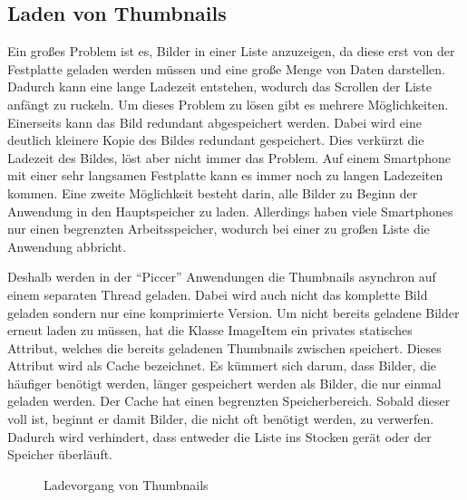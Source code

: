 \subsection{Laden von Thumbnails}
Ein großes Problem ist es, Bilder in einer Liste anzuzeigen,
da diese erst von der Festplatte geladen werden müssen und eine große Menge von Daten darstellen.
Dadurch kann eine lange Ladezeit entstehen,
wodurch das Scrollen der Liste anfängt zu ruckeln.
Um dieses Problem zu lösen gibt es mehrere Möglichkeiten.
Einerseits kann das Bild redundant abgespeichert werden.
Dabei wird eine deutlich kleinere Kopie des Bildes redundant gespeichert.
Dies verkürzt die Ladezeit des Bildes, löst aber nicht immer das Problem.
Auf einem Smartphone mit einer sehr langsamen Festplatte kann es immer noch zu langen Ladezeiten kommen.
Eine zweite Möglichkeit besteht darin, alle Bilder zu Beginn der Anwendung in den Hauptspeicher zu laden.
Allerdings haben viele Smartphones nur einen begrenzten Arbeitsspeicher, wodurch bei einer 
zu großen Liste die Anwendung abbricht.

Deshalb werden in der \enquote{Piccer} Anwendungen die Thumbnails asynchron auf einem separaten Thread geladen.
Dabei wird auch nicht das komplette Bild geladen sondern nur eine komprimierte Version.
Um nicht bereits geladene Bilder erneut laden zu müssen,
hat die Klasse ImageItem ein privates statisches Attribut, welches die bereits geladenen Thumbnails zwischen speichert.
Dieses Attribut wird als Cache bezeichnet. Es kümmert sich darum, dass Bilder, die häufiger 
benötigt werden, länger gespeichert werden als Bilder, die nur einmal geladen werden.
Der Cache hat einen begrenzten Speicherbereich. Sobald dieser voll ist, beginnt er
damit Bilder, die nicht oft benötigt werden, zu verwerfen.
Dadurch wird verhindert, dass entweder die Liste ins Stocken gerät oder der Speicher überläuft.

\begin{figure}[H]
\label{loadThumbnails}
\centering
{}
\caption{Ladevorgang von Thumbnails}
\end{figure}

